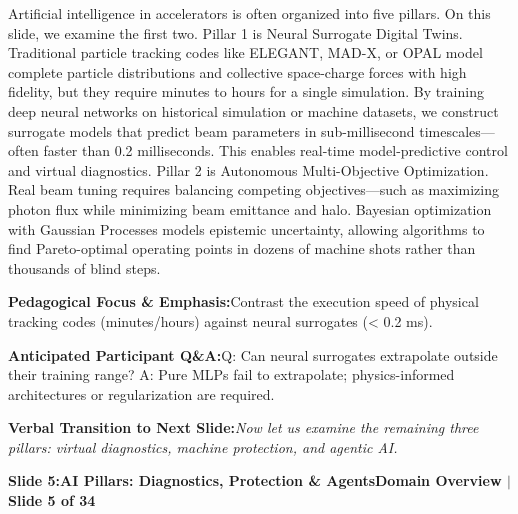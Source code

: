 \documentclass[11pt,a4paper]{article}
\begin{document}
\begin{tcolorbox}[colback=white,colframe=primaryblue,title={\footnotesize\bfseries\color{white}Spoken Presenter Script},fontupper=\small,left=6pt,right=6pt,top=3pt,bottom=3pt,boxrule=0.8pt,arc=2.5pt]
Artificial intelligence in accelerators is often organized into five pillars. On this slide, we examine the first two. Pillar 1 is Neural Surrogate Digital Twins. Traditional particle tracking codes like ELEGANT, MAD-X, or OPAL model complete particle distributions and collective space-charge forces with high fidelity, but they require minutes to hours for a single simulation. By training deep neural networks on historical simulation or machine datasets, we construct surrogate models that predict beam parameters in sub-millisecond timescales—often faster than 0.2 milliseconds. This enables real-time model-predictive control and virtual diagnostics. Pillar 2 is Autonomous Multi-Objective Optimization. Real beam tuning requires balancing competing objectives—such as maximizing photon flux while minimizing beam emittance and halo. Bayesian optimization with Gaussian Processes models epistemic uncertainty, allowing algorithms to find Pareto-optimal operating points in dozens of machine shots rather than thousands of blind steps.
\end{tcolorbox}
\vspace{0.2em}
\begin{tcolorbox}[colback=lightbg,colframe=bordergray,left=6pt,right=6pt,top=3pt,bottom=3pt,boxrule=0.6pt,arc=2.5pt]
\small
\noindent\textbf{\color{navy}Pedagogical Focus \& Emphasis:}\enspace Contrast the execution speed of physical tracking codes (minutes/hours) against neural surrogates (< 0.2 ms).\par\vspace{0.3em}
\noindent\textbf{\color{successgreen}Anticipated Participant Q\&A:}\enspace Q: Can neural surrogates extrapolate outside their training range? A: Pure MLPs fail to extrapolate; physics-informed architectures or regularization are required.\par\vspace{0.3em}
\noindent\textbf{\color{accent}Verbal Transition to Next Slide:}\enspace \emph{Now let us examine the remaining three pillars: virtual diagnostics, machine protection, and agentic AI.}
\end{tcolorbox}
\clearpage
\hypertarget{slide.5}{}
{}
\noindent\begin{tcolorbox}[colback=navy,colframe=navy,left=6pt,right=6pt,top=3pt,bottom=3pt,boxrule=0pt,arc=2pt]
{\large\bfseries\color{white}Slide 5:\enspace AI Pillars: Diagnostics, Protection \& Agents}\hfill{\footnotesize\bfseries\color{white!85!lightbg}Domain Overview \enspace$|$\enspace Slide 5 of 34}
\end{tcolorbox}
\end{document}
